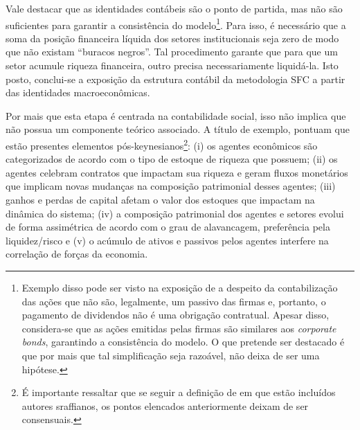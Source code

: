 Vale destacar que as identidades contábeis são o ponto de partida, mas não são suficientes para garantir a consistência do modelo\footnote{Exemplo disso pode ser visto na exposição de  \textcite[p.~27--8]{godley_monetary_2007}  a despeito da contabilização das ações que não são, legalmente, um passivo das firmas e, portanto, o pagamento de dividendos não é uma obrigação contratual. Apesar disso, considera-se que as ações emitidas pelas firmas são similares aos \textit{corporate bonds}, garantindo a consistência do modelo. O que pretende ser destacado é que por mais que tal simplificação seja razoável, não deixa de ser uma hipótese.}. Para isso, é necessário que a soma da posição financeira líquida dos setores institucionais seja zero de modo que não existam ``buracos negros''. Tal procedimento garante que para que um setor acumule riqueza financeira, outro precisa necessariamente liquidá-la. Isto posto, conclui-se a exposição da estrutura contábil da metodologia SFC a partir das identidades macroeconômicas. 

Por mais que esta etapa é centrada na contabilidade social, isso não implica que não possua um componente teórico associado. A título de exemplo, \textcite[p.~15--16]{macedo_e_silva_peering_2011}  pontuam que estão presentes elementos pós-keynesianos\footnote{É importante ressaltar que se seguir a definição de \textcite{lavoie_post-keynesian_2015} em que estão incluídos autores sraffianos, os pontos elencados anteriormente deixam de ser consensuais.}: (i) os agentes econômicos são categorizados de acordo com o tipo de estoque de riqueza que possuem; (ii) os agentes celebram contratos que impactam sua riqueza e geram fluxos monetários que implicam novas mudanças na composição patrimonial desses agentes; (iii) ganhos e perdas de capital afetam o valor dos estoques que impactam na dinâmica do sistema; (iv) a composição patrimonial dos agentes e setores evolui de forma assimétrica de acordo com o grau de alavancagem, preferência
pela liquidez/risco e (v) o acúmulo de ativos e passivos pelos agentes interfere na correlação de forças da economia. 

